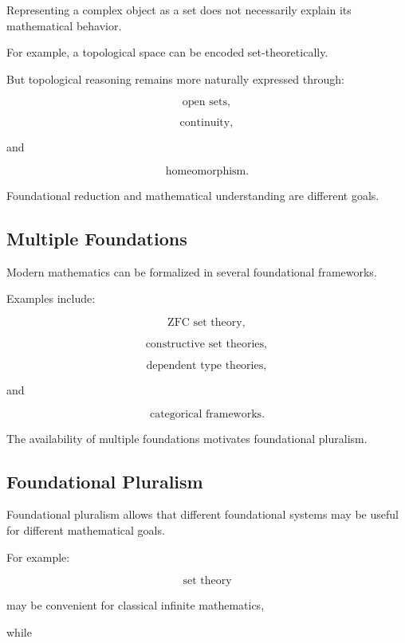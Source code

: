 Representing a complex object as a set does not necessarily explain its
mathematical behavior.

For example, a topological space can be encoded set-theoretically.

But topological reasoning remains more naturally expressed through:

\[
\boxed{
\text{open sets},
}
\]

\[
\boxed{
\text{continuity},
}
\]

and

\[
\boxed{
\text{homeomorphism}.
}
\]

Foundational reduction and mathematical understanding are different goals.

\subsection{Multiple Foundations}
\label{subsec:multiple-foundations}

Modern mathematics can be formalized in several foundational frameworks.

Examples include:

\[
\boxed{
\text{ZFC set theory},
}
\]

\[
\boxed{
\text{constructive set theories},
}
\]

\[
\boxed{
\text{dependent type theories},
}
\]

and

\[
\boxed{
\text{categorical frameworks}.
}
\]

The availability of multiple foundations motivates foundational pluralism.

\subsection{Foundational Pluralism}
\label{subsec:foundational-pluralism}

Foundational pluralism allows that different foundational systems may be
useful for different mathematical goals.

For example:

\[
\boxed{
\text{set theory}
}
\]

may be convenient for classical infinite mathematics,

while

